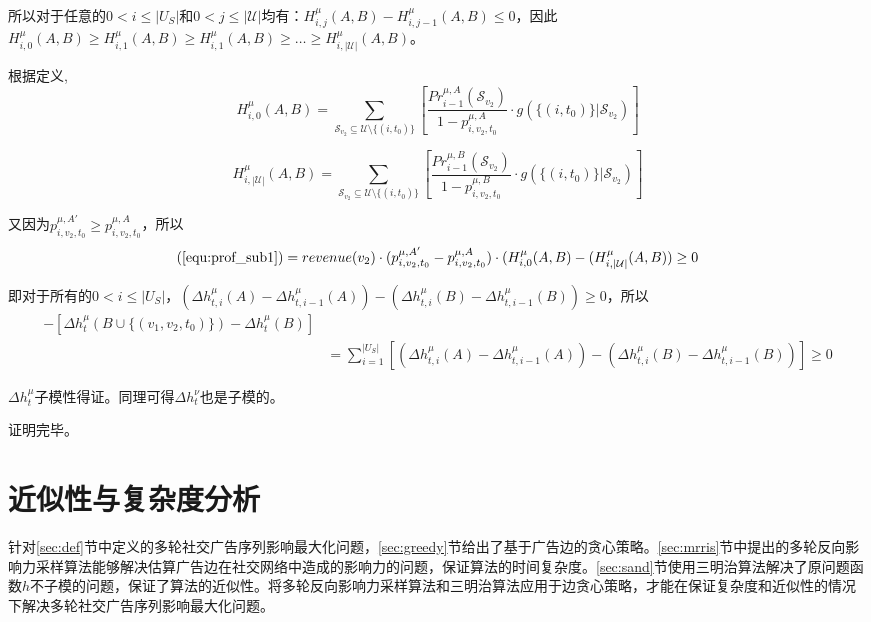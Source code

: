 所以对于任意的$0<i\le |U_S|$和$0<j\le |\mathcal{U}|$均有：$H_{i,j}^{\mu}(A,B)-H_{i,j-1}^{\mu}(A,B) \le 0$，因此$H_{i,0}^{\mu} (A,B)\ge H_{i,1}^{\mu}(A,B) \ge H_{i,1}^{\mu}(A,B) \ge \ldots \ge H_{i,|\mathcal{U}|}^{\mu}(A,B)$。

根据定义,
\begin{equation}
H_{i,0}^{\mu} (A,B)= \sum_{\mathcal{S}_{v_2}\subseteq \mathcal{U}\setminus \{(i,t_0)\}}\left[\frac{Pr_{i-1}^{\mu,A}(\mathcal{S}_{v_2})}{1-p_{i,v_2,t_0}^{\mu,A}} \cdot g(\{(i,t_0)\} |\mathcal{S}_{v_2})\right]
\end{equation}

\begin{equation}
H_{i,|\mathcal{U}|}^{\mu} (A,B)= \sum_{\mathcal{S}_{v_2}\subseteq \mathcal{U}\setminus \{(i,t_0)\}}\left[\frac{Pr_{i-1}^{\mu,B}(\mathcal{S}_{v_2})}{1-p_{i,v_2,t_0}^{\mu,B}} \cdot g(\{(i,t_0)\} |\mathcal{S}_{v_2})\right]
\end{equation}

又因为$p_{i,v_2,t_0}^{\mu,A'}\ge p_{i,v_2,t_0}^{\mu,A}$，所以
\begin{equation}
(\ref{equ:prof_sub1})=revenue(v_2)\cdot (p_{i,v_2,t_0}^{\mu,A'}-p_{i,v_2,t_0}^{\mu,A})\cdot (H_{i,0}^{\mu}(A,B)-(H_{i,|\mathcal{U}|}^{\mu}(A,B)) \ge 0
\end{equation}

即对于所有的$0<i \le |U_S|$，$(\Delta h_{t,i}^{\mu}(A)-\Delta h_{t,i-1}^{\mu}(A)) - (\Delta h_{t,i}^{\mu}(B)-\Delta h_{t,i-1}^{\mu}(B)) \ge 0$，所以
\begin{align}
    [\Delta h_t^\mu(A \cup \{(v_1,v_2,t_0)\}&-\Delta h_t^\mu(A))]- [\Delta h_t^\mu(B\cup \{(v_1,v_2,t_0)\})-\Delta h_t^\mu(B)]\\ 
    &=\sum_{i=1}^{|U_S|}[(\Delta h_{t,i}^{\mu}(A)-\Delta h_{t,i-1}^{\mu}(A)) - (\Delta h_{t,i}^{\mu}(B)-\Delta h_{t,i-1}^{\mu}(B))] \ge 0
\end{align}

$\Delta h_t^\mu$子模性得证。同理可得$\Delta h_t^\nu$也是子模的。

证明完毕。

\section{近似性与复杂度分析}
\label{sec:ana}

针对\ref{sec:def}节中定义的多轮社交广告序列影响最大化问题，\ref{sec:greedy}节给出了基于广告边的贪心策略。\ref{sec:mrris}节中提出的多轮反向影响力采样算法能够解决估算广告边在社交网络中造成的影响力的问题，保证算法的时间复杂度。\ref{sec:sand}节使用三明治算法解决了原问题函数$h$不子模的问题，保证了算法的近似性。将多轮反向影响力采样算法和三明治算法应用于边贪心策略，才能在保证复杂度和近似性的情况下解决多轮社交广告序列影响最大化问题。

